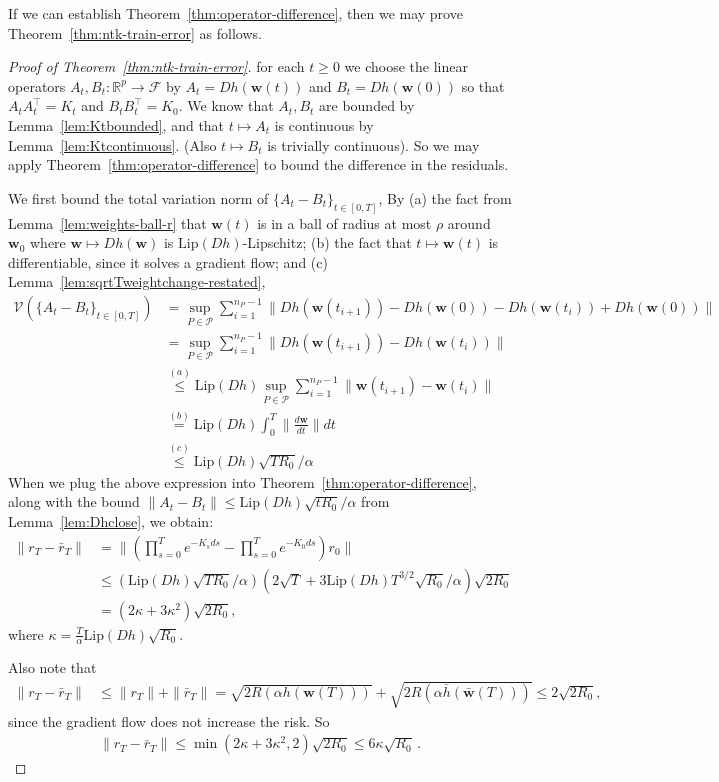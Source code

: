 \documentclass[11pt]{article} %
\newcommand{\R}{\mathbb{R}}
\newcommand{\<}{\langle}
\renewcommand{\>}{\rangle}
\def\bw{{\boldsymbol w}}
\def\cV{{\mathcal V}}
\def\cP{{\mathcal P}}
\def\cF{{\mathcal F}}
\def\cV{{\mathcal V}}
\def\cP{{\mathcal P}}
\def\cF{{\mathcal F}}
\def\cV{{\mathcal V}}
\def\barh{\bar{h}}
\def\barbw{\bar{\bw}}
\newcommand{\Lip}{\mathrm{Lip}}
\theoremstyle{plain}
\theoremstyle{definition}
\theoremstyle{remark}
\begin{document}
If we can establish Theorem~\ref{thm:operator-difference}, then we may prove Theorem~\ref{thm:ntk-train-error} as follows.
\begin{proof}[Proof of Theorem~\ref{thm:ntk-train-error}]
for each $t \geq 0$ we choose the linear operators $A_t, B_t : \R^p \to \cF
$ by
$A_t = Dh(\bw(t))$ and $B_t = Dh(\bw(0))$ so that $A_t A_t^{\top} = K_t$ and $B_t B_t^{\top} = K_0$. We know that $A_t, B_t$ are bounded by Lemma~\ref{lem:Ktbounded}, and that $t \mapsto A_t$ is continuous by Lemma~\ref{lem:Ktcontinuous}. (Also $t \mapsto B_t$ is trivially continuous).
So we may apply Theorem~\ref{thm:operator-difference} to bound the difference in the residuals.

We first bound the total variation norm of $\{A_t - B_t\}_{t \in [0,T]}$, By (a) the fact from Lemma~\ref{lem:weights-ball-r} that $\bw(t)$ is in a ball of radius at most $\rho$ around $\bw_0$ where $\bw \mapsto Dh(\bw)$ is $\Lip(Dh)$-Lipschitz; (b) the fact that $t \mapsto \bw(t)$ is differentiable, since it solves a gradient flow; and (c) Lemma~\ref{lem:sqrtTweightchange-restated},
\begin{align*}
\cV(\{A_t - B_t\}_{t \in [0,T]}) &= \sup_{P \in \cP} \sum_{i=1}^{n_{P}-1} \|Dh(\bw(t_{i+1})) - Dh(\bw(0)) - Dh(\bw(t_i)) + Dh(\bw(0))\| \\
&= \sup_{P \in \cP} \sum_{i=1}^{n_{P}-1} \|Dh(\bw(t_{i+1})) - Dh(\bw(t_i))\| \\
&\stackrel{(a)}{\leq} \Lip(Dh)  \sup_{P \in \cP} \sum_{i=1}^{n_{P}-1} \|\bw(t_{i+1}) - \bw(t_i)\| \\
&\stackrel{(b)}{=} \Lip(Dh) \int_{0}^T \|\frac{d\bw}{dt}\| dt \\
&\stackrel{(c)}{\leq} \Lip(Dh) \sqrt{T R_0} / \alpha
\end{align*}
When we plug the above expression into Theorem~\ref{thm:operator-difference}, along with the bound $\|A_t - B_t\| \leq \Lip(Dh) \sqrt{t R_0} / \alpha$ from Lemma~\ref{lem:Dhclose}, we obtain:
\begin{align*}
\|r_T - \bar{r}_T\| &= \|(\prod_{s=0}^T e^{-K_s ds} - \prod_{s=0}^T e^{-K_0 ds})r_0\| \\
&\leq 
(\Lip(Dh)\sqrt{TR_0} / \alpha) (2\sqrt{T} + 3 \Lip(Dh) T^{3/2} \sqrt{R_0} / \alpha) \sqrt{2R_0}
\\
&= (2\kappa + 3\kappa^2)\sqrt{2R_0},
\end{align*}
where $\kappa = \frac{T}{\alpha}\Lip(Dh) \sqrt{R_0}$.

Also note that
\begin{align*}\|r_T - \bar{r}_T\| &\leq \|r_T\| + \|\bar{r}_T\| = \sqrt{2R(\alpha h(\bw(T)))} + \sqrt{2R(\alpha \barh(\barbw(T)))} \leq 2\sqrt{2R_0},
\end{align*}
since the gradient flow does not increase the risk.
So
\begin{align*}
\|r_T - \bar{r}_T\| \leq \min(2\kappa + 3\kappa^2, 2) \sqrt{2R_0} \leq 6\kappa \sqrt{R_0}\,.
\end{align*}
\end{proof}
\end{document}
